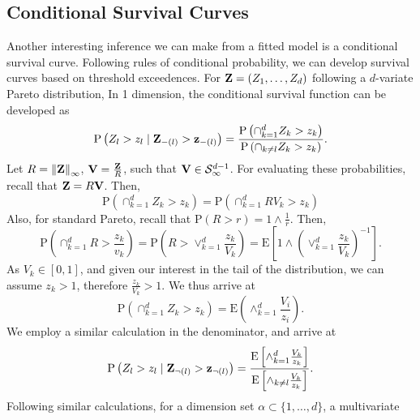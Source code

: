 \subsection{Conditional Survival Curves}
Another interesting inference we can make from a fitted model is a conditional survival curve.
  Following rules of conditional probability, we can develop survival curves based on
  threshold exceedences. For ${\bf Z} = (Z_1,\ldots,Z_d)$ following a $d$-variate Pareto distribution,
  In 1 dimension, the conditional survival function can be developed as
  \begin{equation}
    \label{eqn:condsurv1d}
    \text{P}\left(Z_l > z_l\mid {\bf Z}_{-(l)} > {\bf z}_{-(l)}\right) =
      \frac{\text{P}\left(\cap_{k = 1}^d Z_k > z_k\right)}{\text{P}\left(\cap_{k \neq l} Z_k > z_k\right)}.
  \end{equation}
  Let $R = \left\lVert {\bf Z} \right\rVert_{\infty}$, ${\bf V} = \frac{{\bf Z}}{R}$, such that ${\bf V}\in \mathcal{S}_{\infty}^{d-1}$.
  For evaluating these probabilities, recall that ${\bf Z} = R{\bf V}$.  Then,
  \begin{equation}
    \text{P}\left(\cap_{k = 1}^d Z_k > z_k\right) = \text{P}\left(\cap_{k = 1}^d RV_k > z_k\right)
  \end{equation}
  Also, for standard Pareto, recall that $\text{P}(R > r) = 1\wedge\frac{1}{r}$.  Then,
  \begin{equation}
    \text{P}\left(\cap_{k = 1}^d R > \frac{z_k}{v_k}\right) =
      \text{P}\left(R  > \vee_{k=1}^d\frac{z_k}{V_k}\right) =
      \text{E}\left[1 \wedge \left(\vee_{k = 1}^d\frac{z_k}{V_k}\right)^{-1}\right].
  \end{equation}
  As $V_k \in [0,1]$, and given our interest in the tail of the distribution, we can assume $z_k > 1$,
  therefore $\frac{z_k}{V_k} > 1$.  We thus arrive at
  \begin{equation}
    \text{P}\left(\cap_{k = 1}^dZ_k > z_k\right) = \text{E}\left(\wedge_{k = 1}^d\frac{V_i}{z_i}\right).
  \end{equation}
  We employ a similar calculation in the denominator, and arrive at
  \begin{equation}
    \label{eqn:condsurv1df}
    \text{P}\left(Z_l > z_l\mid {\bf Z}_{\neg(l)} > {\bf z}_{\neg(l)}\right) =
      \frac{\text{E}\left[\wedge_{k = 1}^d \frac{V_k}{z_k}\right]}{\text{E}\left[\wedge_{k \neq l}\frac{V_k}{z_k}\right]}.
  \end{equation}
  Following similar calculations, for a dimension set $\alpha \subset \{1,\ldots, d\}$, a multivariate
